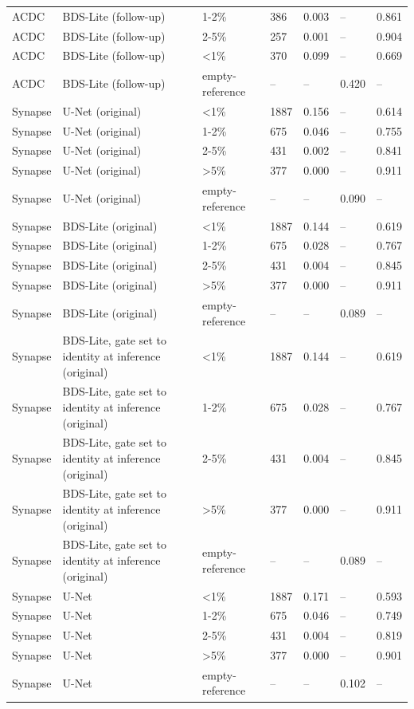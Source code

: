 \begin{longtable}{lllllll}
ACDC & BDS-Lite (follow-up) & 1-2\% & 386 & 0.003 & -- & 0.861 \\
ACDC & BDS-Lite (follow-up) & 2-5\% & 257 & 0.001 & -- & 0.904 \\
ACDC & BDS-Lite (follow-up) & <1\% & 370 & 0.099 & -- & 0.669 \\
ACDC & BDS-Lite (follow-up) & empty-reference & -- & -- & 0.420 & -- \\
Synapse & U-Net (original) & <1\% & 1887 & 0.156 & -- & 0.614 \\
Synapse & U-Net (original) & 1-2\% & 675 & 0.046 & -- & 0.755 \\
Synapse & U-Net (original) & 2-5\% & 431 & 0.002 & -- & 0.841 \\
Synapse & U-Net (original) & >5\% & 377 & 0.000 & -- & 0.911 \\
Synapse & U-Net (original) & empty-reference & -- & -- & 0.090 & -- \\
Synapse & BDS-Lite (original) & <1\% & 1887 & 0.144 & -- & 0.619 \\
Synapse & BDS-Lite (original) & 1-2\% & 675 & 0.028 & -- & 0.767 \\
Synapse & BDS-Lite (original) & 2-5\% & 431 & 0.004 & -- & 0.845 \\
Synapse & BDS-Lite (original) & >5\% & 377 & 0.000 & -- & 0.911 \\
Synapse & BDS-Lite (original) & empty-reference & -- & -- & 0.089 & -- \\
Synapse & BDS-Lite, gate set to identity at inference (original) & <1\% & 1887 & 0.144 & -- & 0.619 \\
Synapse & BDS-Lite, gate set to identity at inference (original) & 1-2\% & 675 & 0.028 & -- & 0.767 \\
Synapse & BDS-Lite, gate set to identity at inference (original) & 2-5\% & 431 & 0.004 & -- & 0.845 \\
Synapse & BDS-Lite, gate set to identity at inference (original) & >5\% & 377 & 0.000 & -- & 0.911 \\
Synapse & BDS-Lite, gate set to identity at inference (original) & empty-reference & -- & -- & 0.089 & -- \\
Synapse & U-Net & <1\% & 1887 & 0.171 & -- & 0.593 \\
Synapse & U-Net & 1-2\% & 675 & 0.046 & -- & 0.749 \\
Synapse & U-Net & 2-5\% & 431 & 0.004 & -- & 0.819 \\
Synapse & U-Net & >5\% & 377 & 0.000 & -- & 0.901 \\
Synapse & U-Net & empty-reference & -- & -- & 0.102 & -- \\

\end{longtable}

